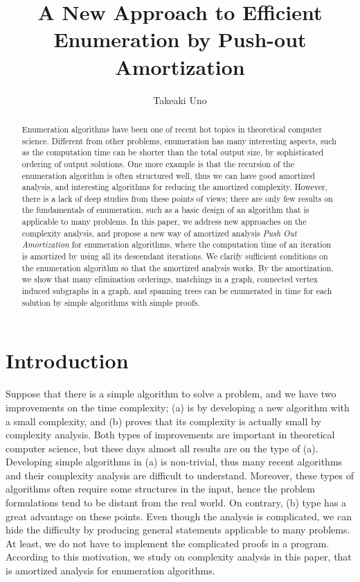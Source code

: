 \documentclass{llncs}
\title{A New Approach to Efficient Enumeration by Push-out Amortization}
\author{Takeaki Uno}
\institute{
\email{uno@nii.jp}, National Institute of Informatics, 
2-1-2, Hitotsubashi, Chiyoda-ku, Tokyo 101-8430, Japan
}
\begin{document}
\maketitle


\begin{abstract}
Enumeration algorithms have been one of recent hot topics in
 theoretical computer science.
Different from other problems, enumeration has many interesting aspects,
 such as the computation time can be shorter than the total output size,
 by sophisticated ordering of output solutions.
One more example is that the recursion of the enumeration algorithm is 
 often structured well, thus we can have good amortized analysis, and 
 interesting algorithms for reducing the amortized complexity.
However, there is a lack of deep studies from these points of views; there 
 are only few results on the fundamentals of enumeration, such as 
 a basic design of an algorithm that is applicable to many problems.
In this paper, we address new approaches on the complexity analysis,
 and propose a new way of amortized analysis {\it Push Out
 Amortization} for enumeration algorithms, where the computation time
 of an iteration is amortized by using all its descendant iterations.
We clarify sufficient conditions on the enumeration algorithm
 so that the amortized analysis works.
By the amortization, we show that many elimination orderings,
 matchings in a graph, connected vertex induced subgraphs in a graph,
 and spanning trees can be enumerated in  time for each
 solution by simple algorithms with simple proofs.
\end{abstract}




\vspace{-10mm}
\section{Introduction}
\vspace{-2mm}

Suppose that there is a simple algorithm to solve a problem, and we 
 have two improvements on the time complexity; (a) is by developing a 
 new algorithm with a small complexity, and (b) proves that its complexity 
 is actually small by complexity analysis.
Both types of improvements are important in theoretical computer science,
 but these days almost all results are on the type of (a).
Developing simple algorithms in (a) is non-trivial, thus many recent
 algorithms and their complexity analysis are difficult to understand.
Moreover, these types of algorithms often require some structures in the
 input, hence the problem formulations tend to be distant from the real world.
On contrary, (b) type has a great advantage on these points.
Even though the analysis is complicated, we can hide the difficulty by
 producing general statements applicable to many problems.
At least, we do not have to implement the complicated proofs in a program.
According to this motivation, we study on complexity analysis in this paper,
 that is amortized analysis for enumeration algorithms.
\end{document}
